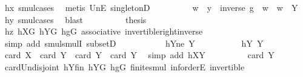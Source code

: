 \begin{isabellebody}
\ hx\ smul{\isachardot}{\kern0pt}cases\ \isamarkupfalse%
\ {\isacharparenleft}{\kern0pt}metis\ UnE\ singletonD{\isacharparenright}{\kern0pt}\isanewline
\ \ \ \ \ \ \isamarkupfalse%
\ \isamarkupfalse%
\ w\ \ {\isachardoublequoteopen}y\ {\isacharequal}{\kern0pt}\ inverse\ g\ {\isasymcdot}\ w{\isachardoublequoteclose}\ \ {\isachardoublequoteopen}w\ {\isasymin}\ Y{\isachardoublequoteclose}\ \isamarkupfalse%
\ hy\ smul{\isachardot}{\kern0pt}cases\ \isamarkupfalse%
\ blast\isanewline
\ \ \ \ \ \ \isamarkupfalse%
\ \isamarkupfalse%
\ {\isacharquery}{\kern0pt}thesis\ \isamarkupfalse%
\ hz\ hXG\ hYG\ hgG\ associative\ invertible{\isacharunderscore}{\kern0pt}right{\isacharunderscore}{\kern0pt}inverse{}\isanewline
\ \ \ \ \ \ \ \ \isamarkupfalse%
\ {\isacharparenleft}{\kern0pt}simp\ add{\isacharcolon}{\kern0pt}\ smul{\isachardot}{\kern0pt}smulI\ subsetD{\isacharparenright}{\kern0pt}\isanewline
\ \ \ \ \isamarkupfalse%
\isanewline
\ \ \isamarkupfalse%
\isanewline
\ \ \isamarkupfalse%
\ hY{}ne{\isacharcolon}{\kern0pt}\ {\isachardoublequoteopen}{\isacharquery}{\kern0pt}Y{}\ {\isasymnoteq}\ {\isacharbraceleft}{\kern0pt}{\isacharbraceright}{\kern0pt}{\isachardoublequoteclose}\isanewline
\ \ \isamarkupfalse%
\isanewline
\ \ \ \ \isamarkupfalse%
\ hY{}{\isacharcolon}{\kern0pt}\ {\isachardoublequoteopen}{\isacharquery}{\kern0pt}Y{}\ {\isacharequal}{\kern0pt}\ {\isacharbraceleft}{\kern0pt}{\isacharbraceright}{\kern0pt}{\isachardoublequoteclose}\isanewline
\ \ \ \ \isamarkupfalse%
\ {\isachardoublequoteopen}card\ X\ {\isacharplus}{\kern0pt}\ card\ Y\ {\isasymle}\ card\ Y\ {\isacharplus}{\kern0pt}\ card\ Y{\isachardoublequoteclose}\ \isamarkupfalse%
\ {\isacharparenleft}{\kern0pt}simp\ add{\isacharcolon}{\kern0pt}\ hXY{\isacharparenright}{\kern0pt}\isanewline
\ \ \ \ \isamarkupfalse%
\ \isamarkupfalse%
\ {\isachardoublequoteopen}{\isachardot}{\kern0pt}{\isachardot}{\kern0pt}{\isachardot}{\kern0pt}\ {\isacharequal}{\kern0pt}\ card\ {\isacharquery}{\kern0pt}Y{}{\isachardoublequoteclose}\ \isamarkupfalse%
\ card{\isacharunderscore}{\kern0pt}Un{\isacharunderscore}{\kern0pt}disjoint\ hYfin\ hYG\ hgG\ finite{\isacharunderscore}{\kern0pt}smul\ inf{\isachardot}{\kern0pt}orderE\ invertible\isanewline

\end{isabellebody}

